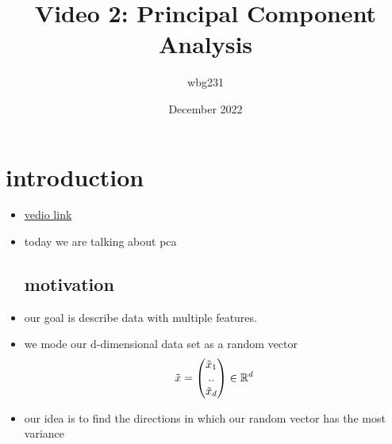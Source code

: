 \documentclass{article}
\title{Video 2: Principal Component Analysis}
\author{wbg231 }
\date{December 2022}
\begin{document}
\maketitle

\section{introduction}
\begin{itemize}
\item \href{https://www.youtube.com/watch?v=l9qIW_UBiZs}{vedio link}
\item today we are talking about pca 
\subsection*{motivation}
\item our goal is describe data with multiple features.
\item we mode our d-dimensional data set as a random vector $$\Tilde{x}=\begin{pmatrix}
    \Tilde{x}_1\\..\\\Tilde{x}_d
\end{pmatrix}\in \mathbb{R}^{d}$$
\item our idea is to find the directions in which our random vector has the most variance 

\end{itemize}
\end{document}
